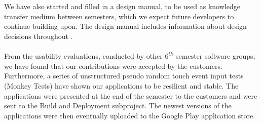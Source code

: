 \\\\
We have also started and filled in a design manual, to be used as knowledge transfer medium between semesters, which we expect future \giraf developers to continue building upon. The design manual includes information about design decisions throughout \giraf.  
\\\\
From the usability evaluations, conducted by other $6^{th}$ semester software groups, we have found that our contributions were accepted by the customers. Furthermore, a series of unstructured pseudo random touch event input tests (Monkey Tests) have shown our applications to be resilient and stable. The applications were presented at the end of the semester to the customers and were sent to the Build and Deployment subproject. The newest versions of the applications were then eventually uploaded to the Google Play application store. 